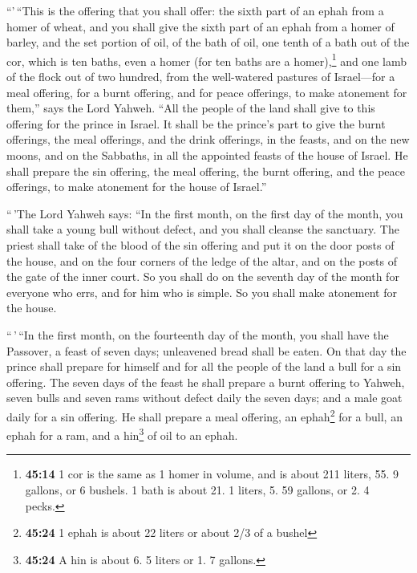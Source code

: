  ``'\,``This is the offering that you shall offer: the
sixth part of an ephah from a homer of wheat, and you shall give the
sixth part of an ephah from a homer of barley,  and the
set portion of oil, of the bath of oil, one tenth of a bath out of the
cor, which is ten baths, even a homer (for ten baths are a
homer),\footnote{\textbf{45:14} 1 cor is the same as 1 homer in volume,
  and is about 211 liters, 55. 9 gallons, or 6 bushels. 1 bath is about
  21. 1 liters, 5. 59 gallons, or 2. 4 pecks.}  and one
lamb of the flock out of two hundred, from the well-watered pastures of
Israel---for a meal offering, for a burnt offering, and for peace
offerings, to make atonement for them,'' says the Lord Yahweh.
 ``All the people of the land shall give to this offering
for the prince in Israel.  It shall be the prince's part
to give the burnt offerings, the meal offerings, and the drink
offerings, in the feasts, and on the new moons, and on the Sabbaths, in
all the appointed feasts of the house of Israel. He shall prepare the
sin offering, the meal offering, the burnt offering, and the peace
offerings, to make atonement for the house of Israel.''

 ``\,'The Lord Yahweh says: ``In the first month, on the
first day of the month, you shall take a young bull without defect, and
you shall cleanse the sanctuary.  The priest shall take
of the blood of the sin offering and put it on the door posts of the
house, and on the four corners of the ledge of the altar, and on the
posts of the gate of the inner court.  So you shall do on
the seventh day of the month for everyone who errs, and for him who is
simple. So you shall make atonement for the house.

 ``\,'\,``In the first month, on the fourteenth day of
the month, you shall have the Passover, a feast of seven days;
unleavened bread shall be eaten.  On that day the prince
shall prepare for himself and for all the people of the land a bull for
a sin offering.  The seven days of the feast he shall
prepare a burnt offering to Yahweh, seven bulls and seven rams without
defect daily the seven days; and a male goat daily for a sin offering.
 He shall prepare a meal offering, an ephah\footnote{\textbf{45:24}
  1 ephah is about 22 liters or about 2/3 of a bushel} for a bull, an
ephah for a ram, and a hin\footnote{\textbf{45:24} A hin is about 6. 5
  liters or 1. 7 gallons.} of oil to an ephah.

